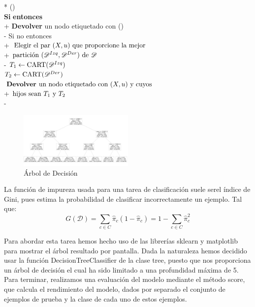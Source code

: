 \documentclass[conference,a4paper]{IEEEtran}
\begin{document}
\begin{pseudo}*
    () \\
    \textbf{Si} \textnormal{} \textbf{entonces} \\+
    \textbf{Devolver} \textnormal{un nodo etiquetado con ()} \\-
    Si no entonces \\+
    \(\textnormal{Elegir el par $(X, u)$ que proporcione la mejor} \) \\+
    \(\textnormal{partición $(\mathscr{D}^{Izq},\mathscr{D}^{Der})$ de $\mathscr{D}$}\) \\-
    \( T_{1} \leftarrow \textnormal{CART($\mathscr{D}^{Izq}$)}\) \\
    \( T_{2} \leftarrow \textnormal{CART($\mathscr{D}^{Der}$)}\) \\
    \(\textbf{Devolver } \textnormal{un nodo etiquetado con ($X, u$) y cuyos}\)\\+
    \(\textnormal{hijos sean $T_{1}$  y $T_{2}$}\)\\-
 \end{pseudo}



\begin{figure} %
    \centering
    \includegraphics[width=0.5\textwidth]{./ImagenesMemoria/Arbol}
    \caption{\label{fig:arbolDecision}Árbol de Decisión}
\end{figure}

 La función de impureza usada para una tarea de clasificación suele serel índice de Gini, pues estima la probabilidad de clasificar incorrectamente un ejemplo. Tal que: 
\begin{equation}
G(\mathscr{D}) = \sum_{c\in C} \hat{\pi}_c (1-  \hat{\pi}_c) = 1 -  \sum_{c\in C}  \hat{\pi}_c^2
\end{equation}

Para abordar esta tarea hemos hecho uso de las librerías sklearn y matplotlib para mostrar el árbol resultado por pantalla. Dada la naturaleza hemos decidido usar la función DecisionTreeClassifier de la clase tree, puesto que nos proporciona un árbol de decisión el cual ha sido limitado a una profundidad máxima de 5. Para terminar, realizamos una evaluación del modelo mediante el método score, que calcula el rendimiento del modelo, dados por separado el conjunto de ejemplos de prueba y la clase de cada uno de estos ejemplos.
\end{document}
